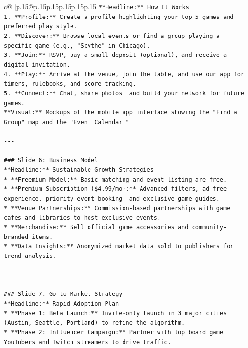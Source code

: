 \documentclass{article}
\begin{document}
{\begin{supertabular}{c@{$\;$}|p{.15\linewidth}@{}p{.15\linewidth}p{.15\linewidth}p{.15\linewidth}p{.15\linewidth}p{.15\linewidth}}
{{{\texttt{**Headline:** How It Works} \\
\texttt{1.  **Profile:** Create a profile highlighting your top 5 games and preferred play style.} \\
\texttt{2.  **Discover:** Browse local events or find a group playing a specific game (e.g., "Scythe" in Chicago).} \\
\texttt{3.  **Join:** RSVP, pay a small deposit (optional), and receive a digital invitation.} \\
\texttt{4.  **Play:** Arrive at the venue, join the table, and use our app for timers, rulebooks, and score tracking.} \\
\texttt{5.  **Connect:** Chat, share photos, and build your network for future games.} \\
\texttt{**Visual:** Mockups of the mobile app interface showing the "Find a Group" map and the "Event Calendar."} \\
\\ 
\texttt{{-}{-}{-}} \\
\\ 
\texttt{\#\#\# Slide 6: Business Model} \\
\texttt{**Headline:** Sustainable Growth Strategies} \\
\texttt{*   **Freemium Model:** Basic matching and event listing are free.} \\
\texttt{*   **Premium Subscription (\$4.99/mo):** Advanced filters, ad{-}free experience, priority event booking, and exclusive game guides.} \\
\texttt{*   **Venue Partnerships:** Commission{-}based partnerships with game cafes and libraries to host exclusive events.} \\
\texttt{*   **Merchandise:** Sell official game accessories and community{-}branded items.} \\
\texttt{*   **Data Insights:** Anonymized market data sold to publishers for trend analysis.} \\
\\ 
\texttt{{-}{-}{-}} \\
\\ 
\texttt{\#\#\# Slide 7: Go{-}to{-}Market Strategy} \\
\texttt{**Headline:** Rapid Adoption Plan} \\
\texttt{*   **Phase 1: Beta Launch:** Invite{-}only launch in 3 major cities (Austin, Seattle, Portland) to refine the algorithm.} \\
\texttt{*   **Phase 2: Influencer Campaign:** Partner with top board game YouTubers and Twitch streamers to drive traffic.} \\
}}}
\end{supertabular}}
\end{document}
